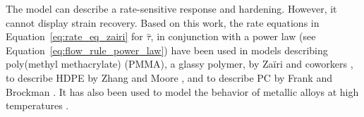 The model can describe a rate-sensitive response and hardening.
However, it cannot display strain recovery.
Based on this work, the rate equations in Equation~\eqref{eq:rate_eq_zairi} for $\hat \tau$, in conjunction with a power law (see Equation~\eqref{eq:flow_rule_power_law}) have been used in models describing poly(methyl methacrylate) (PMMA), a glassy polymer, by Zaïri and coworkers \citep{zairiPhenomenologicalNonlinearModelling2005, zairiElastoviscoplasticConstitutiveEquations2007,zairiModellingElastoviscoplasticDamage2008}, to describe HDPE by Zhang and Moore \citep{zhangNonlinearMechanicalResponse1997}, and to describe PC by Frank and Brockman \citep{frankViscoelasticViscoplasticConstitutive2001}.
It has also been used to model the behavior of metallic alloys at high temperatures \citep{desouzanetoComputationalMethodsPlasticity2008}.

